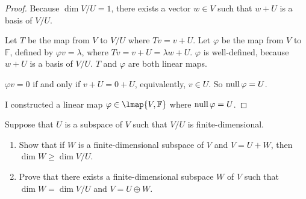 \begin{proof}
    Because $\dim V/U = 1$, there exists a vector $w\in V$ such that $w + U$ is a basis of $V/U$.

    Let $T$ be the map from $V$ to $V/U$ where $Tv = v + U$. Let $\varphi$ be the map from $V$ to $\mathbb{F}$, defined by $\varphi v = \lambda$, where $Tv = v + U = \lambda w + U$. $\varphi$ is well-defined, because $w + U$ is a basis of $V/U$. $T$ and $\varphi$ are both linear maps.

    $\varphi v = 0$ if and only if $v + U = 0 + U$, equivalently, $v\in U$. So $\text{null}\,{\varphi} = U$.

    I constructed a linear map $\varphi\in\lmap{V, \mathbb{F}}$ where $\text{null}\,{\varphi} = U$.
\end{proof}
\newpage

\begin{exercise}
    Suppose that $U$ is a subspace of $V$ such that $V/U$ is finite-dimensional.
    \begin{enumerate}[label={(\alph*)}]
        \item Show that if $W$ is a finite-dimensional subspace of $V$ and $V = U + W$, then $\dim W \geq \dim V/U$.
        \item Prove that there exists a finite-dimensional subspace $W$ of $V$ such that $\dim W = \dim V/U$ and $V = U\oplus W$.
    \end{enumerate}
\end{exercise}

